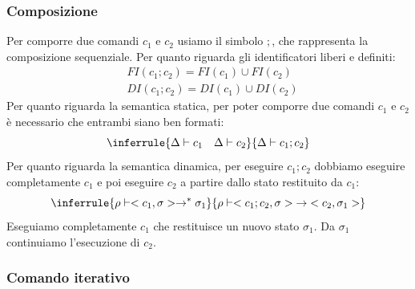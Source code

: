 \documentclass[a4paper]{article}
\begin{document}
\subsubsection{Composizione} 
Per comporre due comandi $c_1$ e $c_2$ usiamo il simbolo $;$, che rappresenta la composizione sequenziale.
Per quanto riguarda gli identificatori liberi e definiti:
\[
\begin{aligned}
  &FI(c_1; c_2) = FI(c_1) \cup FI(c_2)\\
  &DI(c_1; c_2) = DI(c_1) \cup DI(c_2)
\end{aligned}
\]
Per quanto riguarda la semantica statica, per poter comporre due comandi $c_1$ e $c_2$ è necessario che entrambi siano ben formati:
\[
  \inferrule
  {\Delta \vdash c_1 \quad \Delta \vdash c_2}
  {\Delta \vdash c_1 ; c_2}
\]
Per quanto riguarda la semantica dinamica, per eseguire $c_1 ; c_2$ dobbiamo eseguire completamente $c_1$ e poi eseguire $c_2$ a partire dallo stato restituito da $c_1$:
\[
  \inferrule 
  {\rho \vdash <c_1, \sigma> \to^* \sigma_1}
  {\rho \vdash <c_1 ; c_2, \sigma> \; \to \; <c_2, \sigma_1>}
\]
Eseguiamo completamente $c_1$ che restituisce un nuovo stato $\sigma_1$.
Da $\sigma_1$ continuiamo l'esecuzione di $c_2$.

\subsubsection{Comando iterativo}
\end{document}
